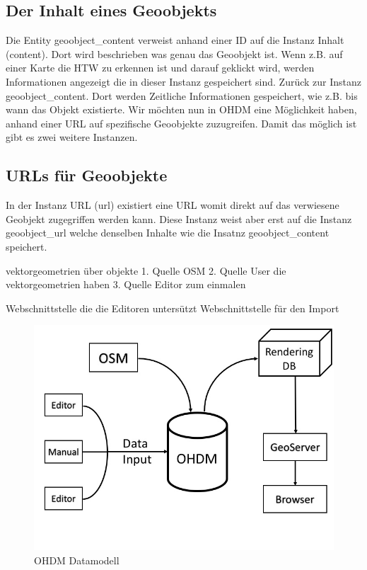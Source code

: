 \subsection{Der Inhalt eines Geoobjekts}
Die Entity geoobject\_content verweist anhand einer ID auf die Instanz Inhalt (content). Dort wird beschrieben was genau das Geoobjekt ist. Wenn z.B. auf einer Karte die HTW zu erkennen ist und darauf geklickt wird, werden Informationen angezeigt die in dieser Instanz gespeichert sind. Zurück zur Instanz geoobject\_content. Dort werden Zeitliche Informationen gespeichert, wie z.B. bis wann das Objekt existierte. 
Wir möchten nun in OHDM eine Möglichkeit haben, anhand einer URL auf spezifische Geoobjekte zuzugreifen. Damit das möglich ist gibt es zwei weitere Instanzen.

\subsection{URLs für Geoobjekte}
In der Instanz URL (url) existiert eine URL womit direkt auf das verwiesene Geobjekt zugegriffen werden kann. Diese Instanz weist aber erst auf die Instanz geoobject\_url welche denselben Inhalte wie die Insatnz geoobject\_content speichert.

vektorgeometrien über objekte
1. Quelle OSM
2. Quelle User die vektorgeometrien haben
3. Quelle Editor zum einmalen

Webschnittstelle die die Editoren untersützt
Webschnittstelle für den Import

\begin{figure}[h!]
\centering
\includegraphics[width=127mm]{ohdm_datenmodell/Bilder/data.jpg}
\caption{OHDM Datamodell}
\label{fig:datamodell}
\end{figure}


